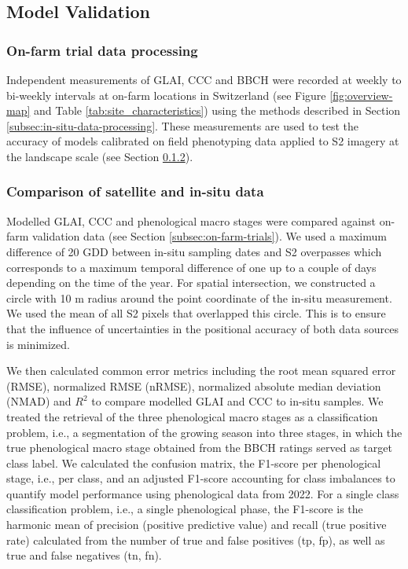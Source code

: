 \subsection{Model Validation}
\label{subsec:model-validation}

\subsubsection{On-farm trial data processing}
Independent measurements of GLAI, CCC and BBCH were recorded at weekly to bi-weekly intervals at on-farm locations in Switzerland (see Figure \ref{fig:overview-map} and Table \ref{tab:site_characteristics}) using the methods described in Section \ref{subsec:in-situ-data-processing}. These measurements are used to test the accuracy of models calibrated on field phenotyping data applied to S2 imagery at the landscape scale (see Section \ref{subsubsec:comparison-sat-insitu}).

\subsubsection{Comparison of satellite and in-situ data}
\label{subsubsec:comparison-sat-insitu}
Modelled GLAI, CCC and phenological macro stages were compared against on-farm validation data (see Section \ref{subsec:on-farm-trials}). We used a maximum difference of 20 GDD between in-situ sampling dates and S2 overpasses which corresponds to a maximum temporal difference of one up to a couple of days depending on the time of the year. For spatial intersection, we constructed a circle with 10 m radius around the point coordinate of the in-situ measurement. We used the mean of all S2 pixels that overlapped this circle. This is to ensure that the influence of uncertainties in the positional accuracy of both data sources is minimized.

We then calculated common error metrics including the root mean squared error (RMSE), normalized RMSE (nRMSE), normalized absolute median deviation (NMAD) and $R^2$ to compare modelled GLAI and CCC to in-situ samples. We treated the retrieval of the three phenological macro stages as a classification problem, i.e., a segmentation of the growing season into three stages, in which the true phenological macro stage obtained from the BBCH ratings served as target class label. We calculated the confusion matrix, the F1-score per phenological stage, i.e., per class, and an adjusted F1-score accounting for class imbalances to quantify model performance using phenological data from 2022.
For a single class classification problem, i.e., a single phenological phase, the F1-score is the harmonic mean of precision (positive predictive value) and recall (true positive rate) calculated from the number of true and false positives (tp, fp), as well as true and false negatives (tn, fn).

